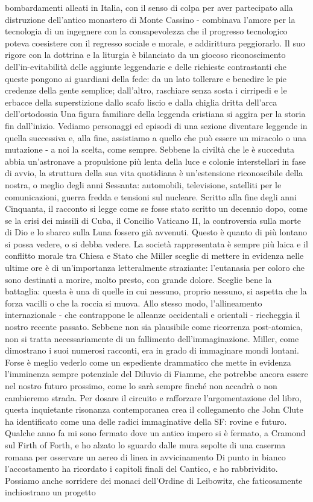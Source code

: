 bombardamenti alleati in Italia, con il senso di colpa per aver partecipato alla distruzione dell'antico monastero di Monte Cassino - combinava l'amore per la tecnologia di un ingegnere con la consapevolezza che il progresso tecnologico poteva coesistere con il regresso sociale e morale, e addirittura peggiorarlo. Il suo rigore con la dottrina e la liturgia è bilanciato da un giocoso riconoscimento dell'in-evitabilità delle aggiunte leggendarie e delle richieste contrastanti che queste pongono ai guardiani della fede: da un lato tollerare e benedire le pie credenze della gente semplice; dall'altro, raschiare senza sosta i cirripedi e le erbacce della superstizione dallo scafo liscio e dalla chiglia dritta dell'arca dell'ortodossia Una figura familiare della leggenda cristiana si aggira per la storia fin dall'inizio. Vediamo personaggi ed episodi di una sezione diventare leggende in quella successiva e, alla fine, assistiamo a quello che può essere un miracolo o una mutazione - a noi la scelta, come sempre. Sebbene la civiltà che le è succeduta abbia un'astronave a propulsione più lenta della luce e colonie interstellari in fase di avvio, la struttura della sua vita quotidiana è un'estensione riconoscibile della nostra, o meglio degli anni Sessanta: automobili, televisione, satelliti per le comunicazioni, guerra fredda e tensioni sul nucleare. Scritto alla fine degli anni Cinquanta, il racconto si legge come se fosse stato scritto un decennio dopo, come se la crisi dei missili di Cuba, il Concilio Vaticano II, la controversia sulla morte di Dio e lo sbarco sulla Luna fossero già avvenuti. Questo è quanto di più lontano si possa vedere, o si debba vedere. La società rappresentata è sempre più laica e il conflitto morale tra Chiesa e Stato che Miller sceglie di mettere in evidenza nelle ultime ore è di un'importanza letteralmente straziante: l'eutanasia per coloro che sono destinati a morire, molto presto, con grande dolore. Sceglie bene la battaglia: questa è una di quelle in cui nessuno, proprio nessuno, si aspetta che la forza vacilli o che la roccia si muova. Allo stesso modo, l'allineamento internazionale - che contrappone le alleanze occidentali e orientali - riecheggia il nostro recente passato. Sebbene non sia plausibile come ricorrenza post-atomica, non si tratta necessariamente di un fallimento dell'immaginazione. Miller, come dimostrano i suoi numerosi racconti, era in grado di immaginare mondi lontani. Forse è meglio vederlo come un espediente drammatico che mette in evidenza l'imminenza sempre potenziale del Diluvio di Fiamme, che potrebbe ancora essere nel nostro futuro prossimo, come lo sarà sempre finché non accadrà o non cambieremo strada. Per dosare il circuito e rafforzare l'argomentazione del libro, questa inquietante risonanza contemporanea crea il collegamento che John Clute ha identificato come una delle radici immaginative della SF: rovine e futuro. Qualche anno fa mi sono fermato dove un antico impero si è fermato, a Cramond sul Firth of Forth, e ho alzato lo sguardo dalle mura sepolte di una caserma romana per osservare un aereo di linea in avvicinamento Di punto in bianco l'accostamento ha ricordato i capitoli finali del Cantico, e ho rabbrividito. Possiamo anche sorridere dei monaci dell'Ordine di Leibowitz, che faticosamente inchiostrano un progetto 